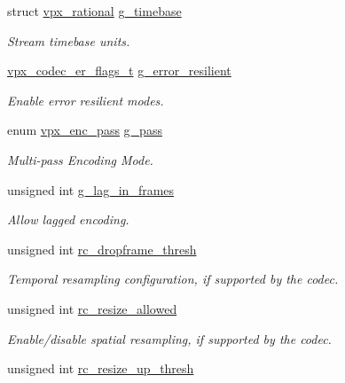 \begin{DoxyCompactItemize}
struct \hyperlink{structvpx__rational}{vpx\-\_\-rational} \hyperlink{structvpx__codec__enc__cfg_a6498d378e4c29ef3e22258289e481087}{g\-\_\-timebase}
\begin{DoxyCompactList}\small\item\em \-Stream timebase units. \end{DoxyCompactList}\item 
\hyperlink{group__encoder_ga77e0e1fff62556a4f4d54c84467a41f3}{vpx\-\_\-codec\-\_\-er\-\_\-flags\-\_\-t} \hyperlink{structvpx__codec__enc__cfg_a4e17173b66ca0d7dfba9978625d7ba76}{g\-\_\-error\-\_\-resilient}
\begin{DoxyCompactList}\small\item\em \-Enable error resilient modes. \end{DoxyCompactList}\item 
enum \hyperlink{group__encoder_ga476c5417f9c15a1dc5d3f68fa44c493f}{vpx\-\_\-enc\-\_\-pass} \hyperlink{structvpx__codec__enc__cfg_a70d62d87aae7d1168746577f14a6dccf}{g\-\_\-pass}
\begin{DoxyCompactList}\small\item\em \-Multi-\/pass \-Encoding \-Mode. \end{DoxyCompactList}\item 
unsigned int \hyperlink{structvpx__codec__enc__cfg_a992668d9e30305f3f7ab2672ea31a890}{g\-\_\-lag\-\_\-in\-\_\-frames}
\begin{DoxyCompactList}\small\item\em \-Allow lagged encoding. \end{DoxyCompactList}\item 
unsigned int \hyperlink{structvpx__codec__enc__cfg_a619269f9a6904de58c4790e6806a3905}{rc\-\_\-dropframe\-\_\-thresh}
\begin{DoxyCompactList}\small\item\em \-Temporal resampling configuration, if supported by the codec. \end{DoxyCompactList}\item 
unsigned int \hyperlink{structvpx__codec__enc__cfg_a02a4e2f18fb0fdfff44df8b0d9a99d6c}{rc\-\_\-resize\-\_\-allowed}
\begin{DoxyCompactList}\small\item\em \-Enable/disable spatial resampling, if supported by the codec. \end{DoxyCompactList}\item 
unsigned int \hyperlink{structvpx__codec__enc__cfg_a855599c0660f31dfcab4a64996b4f6ad}{rc\-\_\-resize\-\_\-up\-\_\-thresh}

\end{DoxyCompactItemize}
